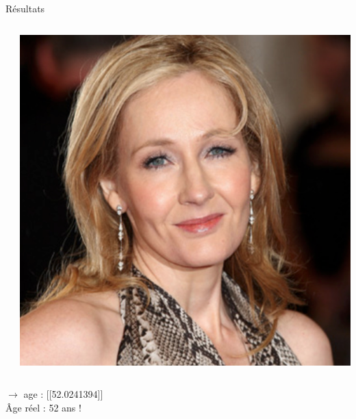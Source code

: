 \documentclass[compress]{beamer}
\begin{document}
\begin{frame}{Résultats}
  \begin{columns}
    \begin{column}{0.6\linewidth}
      \inputminted[fontsize=\scriptsize]{python}{code6.py}
    \end{column}
    \begin{column}{0.4\linewidth}
      \centering
      \includegraphics[width=\linewidth]{resources/JKrowling}
    \end{column}
  \end{columns}
    $\rightarrow$ age : [[52.0241394]]\\
    Âge réel : 52 ans !
\end{frame}

\subsection{}
\end{document}
